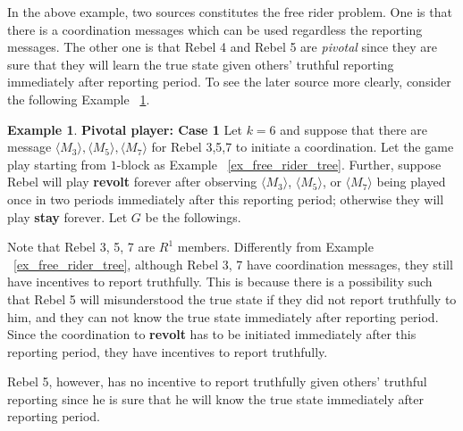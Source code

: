 \documentclass[12pt,letter]{article}
\theoremstyle{definition}
\newtheorem{example}{Example}[section]
\theoremstyle{remark}
\theoremstyle{claim}
\begin{document}
In the above example, two sources constitutes the free rider problem. One is that there is a coordination messages which can be used regardless the reporting messages. The other one is that Rebel 4 and Rebel 5 are \textit{pivotal} since they are sure that they will learn the true state given others' truthful reporting immediately after reporting period. To see the later source more clearly, consider the following Example ~\ref{ex_pivotal_1}.



\begin{example} \label{ex_pivotal_1}\textbf{Pivotal player: Case 1}
Let $k=6$ and suppose that there are message $\langle M_3 \rangle,\langle M_5 \rangle, \langle M_7 \rangle$ for Rebel 3,5,7 to initiate a coordination. Let the game play starting from $1$-block as Example ~\ref{ex_free_rider_tree}. Further, suppose Rebel will play \textbf{revolt} forever after observing $\langle M_3 \rangle$, $\langle M_5 \rangle$, or $\langle M_7 \rangle$ being played once in two periods immediately after this reporting period; otherwise they will play \textbf{stay} forever. Let $G$ be the followings.
\begin{center}
\end{center}

Note that Rebel 3, 5, 7 are $R^1$ members. Differently from Example ~\ref{ex_free_rider_tree}, although Rebel 3, 7 have coordination messages, they still have incentives to report truthfully. This is because there is a possibility such that Rebel 5 will misunderstood the true state if they did not report truthfully to him, and they can not know the true state immediately after reporting period. Since the coordination to \textbf{revolt} has to be initiated immediately after this reporting period, they have incentives to report truthfully.

Rebel 5, however, has no incentive to report truthfully given others' truthful reporting since he is sure that he will know the true state immediately after reporting period.
\end{example}
   
\end{document}

